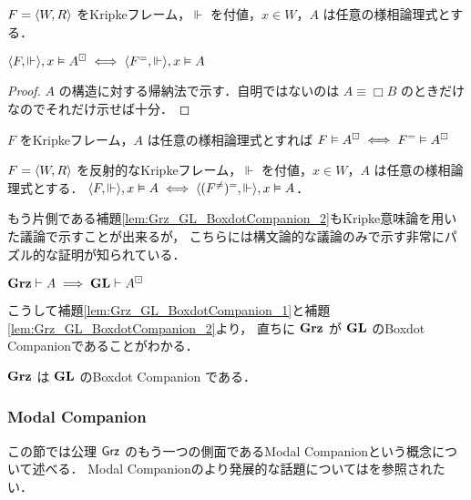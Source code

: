 \documentclass{jsarticle}
\begin{document}
\begin{lemma}
	$F = \langle W, R \rangle$ をKripkeフレーム，$\Vdash$ を付値，$x \in W$，$A$ は任意の様相論理式とする．

	$\langle F, \Vdash \rangle, x \vDash A^\boxdot \iff \langle F^{=}, \Vdash \rangle, x \vDash A$
\end{lemma}

\begin{proof}
	$A$ の構造に対する帰納法で示す．自明ではないのは $A \equiv \Box B$ のときだけなのでそれだけ示せば十分．
\end{proof}

\begin{corollary}
	$F$ をKripkeフレーム，$A$ は任意の様相論理式とすれば $F \vDash A^\boxdot \iff F^{=} \vDash A^\boxdot$
\end{corollary}

\begin{lemma}
	$F = \langle W, R \rangle$ を反射的なKripkeフレーム，$\Vdash$ を付値，$x \in W$，$A$ は任意の様相論理式とする．
	$\langle F,\Vdash \rangle, x \vDash A \iff \langle (F^{\neq})^{=}, \Vdash \rangle, x \vDash A$．
\end{lemma}


もう片側である補題\ref{lem:Grz_GL_BoxdotCompanion_2}もKripke意味論を用いた議論で示すことが出来るが，
こちらには構文論的な議論のみで示す非常にパズル的な証明\cite[pp163-164]{boolos_logic_1994}が知られている．

\begin{lemma}\label{lem:Grz_GL_BoxdotCompanion_2}
	$\mathbf{Grz} \vdash A \implies \mathbf{GL} \vdash A^\boxdot$
\end{lemma}


こうして補題\ref{lem:Grz_GL_BoxdotCompanion_1}と補題\ref{lem:Grz_GL_BoxdotCompanion_2}より，
直ちに $\mathbf{Grz}$ が $\mathbf{GL}$ のBoxdot Companionであることがわかる．

\begin{theorem}\label{thm:Grz_GL_BoxdotCompanion}
	$\mathbf{Grz}$ は $\mathbf{GL}$ のBoxdot Companion である．
\end{theorem}


\subsubsection{Modal Companion}\label{sect:modal_copanion}

この節では公理 $\mathsf{Grz}$ のもう一つの側面であるModal Companionという概念について述べる．
Modal Companionのより発展的な話題については\cite*{chagrov_modal_1992}を参照されたい．
\end{document}
